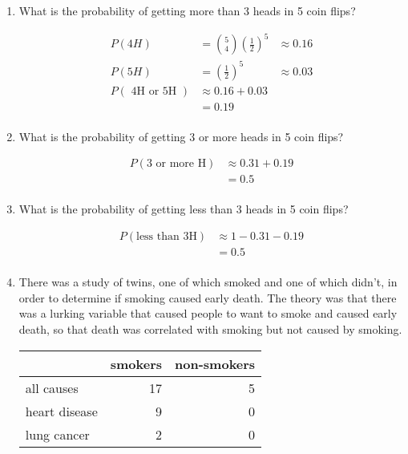 \documentclass[landscape]{exam}
\begin{document}
\begin{enumerate}
    \item What is the probability of getting more than 3 heads in 5 coin flips?
      \begin{solution}
        \begin{align*}
          P( 4H ) & = \binom{5}{4} \left( \frac{1}{2} \right)^5 
                           & \approx \boxed{ 0.16 } \\
          P( 5H ) & = \left( \frac{1}{2} \right)^5 
                           & \approx \boxed{ 0.03 } \\
          P( \text{ 4H or 5H } ) & \approx 0.16 + 0.03 \\
                                 & = 0.19 \\
        \end{align*}
      \end{solution}

    \item What is the probability of getting 3 or more heads in 5 coin flips?
      \begin{solution}
        \begin{align*}
          P( \text{3 or more H} ) & \approx 0.31 + 0.19 \\
                                   & = 0.5 \\
        \end{align*}
      \end{solution}

    \item What is the probability of getting less than 3 heads in 5 coin flips?
      \begin{solution}
        \begin{align*}
          P( \text{less than 3H} ) & \approx 1 - 0.31 - 0.19 \\
                                   & = 0.5 \\
        \end{align*}
      \end{solution}

    \item There was a study of twins, one of which smoked and one of which
      didn't, in order to determine if smoking caused early death. The theory
      was that there was a lurking variable that caused people to want to smoke
      and caused early death, so that death was correlated with smoking but not
      caused by smoking.

      \begin{tabular}[H]{lrr}
        \toprule
                      & smokers & non-smokers \\
        \midrule
        all causes    & 17      & 5 \\
        heart disease & 9       & 0 \\
        lung cancer   & 2       & 0 \\
        \bottomrule
      \end{tabular}


\end{enumerate}
\end{document}
